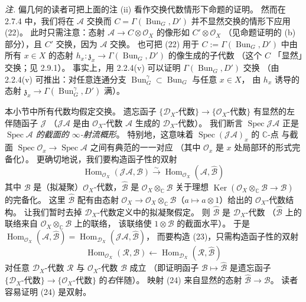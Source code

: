 \emph{注.} 偏几何的读者可把上面的注 (ii) 看作交换代数情形下命题的证明。
然而在 2.7.4 中，我们将在 $\mathcal{A}$ 交换而 $C=\Gamma(\operatorname{Bun}_G,D')$ 并不显然交换的情形下应用 (22)。
此时只需注意：态射 $\mathcal{A}\to C\otimes\mathcal{O}_X$ 的像形如 $C'\otimes\mathcal{O}_X$
（见命题证明的 (b) 部分），且 $C'$ 交换，因为 $\mathcal{A}$ 交换。
也可把 (22) 用于 $C:=\Gamma(\operatorname{Bun}_G,D')$ 中由所有 $x\in X$ 的态射
$h_x: \mathfrak{z}_x\to\Gamma(\operatorname{Bun}_G,D')$ 的像生成的子代数
（这个 $C$ 「显然」交换；见 2.9.1）。
事实上，用 2.2.4(v) 可以证明 $\Gamma(\operatorname{Bun}_G,D')$ 交换
（由 2.2.4(v) 可推出：对任意连通分支
$\operatorname{Bun}_G^\gamma\subset\operatorname{Bun}_G$ 与任意 $x\in X$，
由 $h_x$ 诱导的态射 $\mathfrak{z}_x\to\Gamma(\operatorname{Bun}_G^\gamma,D')$ 满）。

 本小节中所有代数均假定交换。
遗忘函子 $\{\mathcal{D}_X\text{-代数}\}\to\{\mathcal{O}_X\text{-代数}\}$ 有显然的左伴随函子 $\mathcal{J}$
（$\mathcal{J}\mathcal{A}$ 是由 $\mathcal{O}_X$-代数 $\mathcal{A}$ 生成的 $\mathcal{D}_X$-代数）。
我们断言 $\operatorname{Spec}\mathcal{J}\mathcal{A}$ 正是
\emph{$\operatorname{Spec}\mathcal{A}$ 的截面的 $\infty$-射流概形}。
特别地，这意味着 $\operatorname{Spec}(\mathcal{J}\mathcal{A})_x$ 的 $\mathbb{C}$-点
与截面 $\operatorname{Spec}\mathcal{O}_x\to\operatorname{Spec}\mathcal{A}$ 之间有典范的一一对应
（其中 $\mathcal{O}_x$ 是 $x$ 处局部环的形式完备化）。
更确切地说，我们要构造函子性的双射
\begin{equation}\tag{23}
\operatorname{Hom}_{\mathcal{O}_X}(\mathcal{J}\mathcal{A},\mathcal{B})
\overset{\sim}{\longrightarrow}
\operatorname{Hom}_{\mathcal{O}_X}(\mathcal{A},\hat{\mathcal{B}})
\end{equation}
其中 $\mathcal{B}$ 是（拟凝聚）$\mathcal{O}_X$-代数，$\hat{\mathcal{B}}$ 是
$\mathcal{O}_X\otimes_{\mathbb{C}}\mathcal{B}$ 关于理想
$\operatorname{Ker}(\mathcal{O}_X\otimes_{\mathbb{C}}\mathcal{B}\to\mathcal{B})$ 的完备化。
这里 $\hat{\mathcal{B}}$ 配有由态射
$\mathcal{O}_X\to\mathcal{O}_X\otimes_{\mathbb{C}}\mathcal{B}$（$a\mapsto a\otimes 1$）给出的
$\mathcal{O}_X$-代数结构。
让我们暂时去掉 $\mathcal{D}_X$-代数定义中的拟凝聚假定。
则 $\hat{\mathcal{B}}$ 是 $\mathcal{D}_X$-代数
（$\hat{\mathcal{B}}$ 上的联络来自 $\mathcal{O}_X\otimes_{\mathbb{C}}\mathcal{B}$ 上的联络，
该联络使 $1\otimes\mathcal{B}$ 的截面水平）。
于是 $\operatorname{Hom}_{\mathcal{O}_X}(\mathcal{A},\hat{\mathcal{B}})
=\operatorname{Hom}_{\mathcal{D}_X}(\mathcal{J}\mathcal{A},\hat{\mathcal{B}})$，
而要构造 (23)，只需构造函子性的双射
\begin{equation}\tag{24}
\operatorname{Hom}_{\mathcal{O}_X}(\mathcal{R},\mathcal{B})
\longleftarrow
\operatorname{Hom}_{\mathcal{D}_X}(\mathcal{R},\hat{\mathcal{B}})
\end{equation}
对任意 $\mathcal{D}_X$-代数 $\mathcal{R}$ 与 $\mathcal{O}_X$-代数 $\mathcal{B}$ 成立
（即证明函子 $\mathcal{B}\mapsto\hat{\mathcal{B}}$ 是遗忘函子
$\{\mathcal{D}_X\text{-代数}\}\to\{\mathcal{O}_X\text{-代数}\}$ 的\emph{右}伴随）。
映射 (24) 来自显然的态射 $\hat{\mathcal{B}}\to\mathcal{B}$。
读者容易证明 (24) 是双射。

